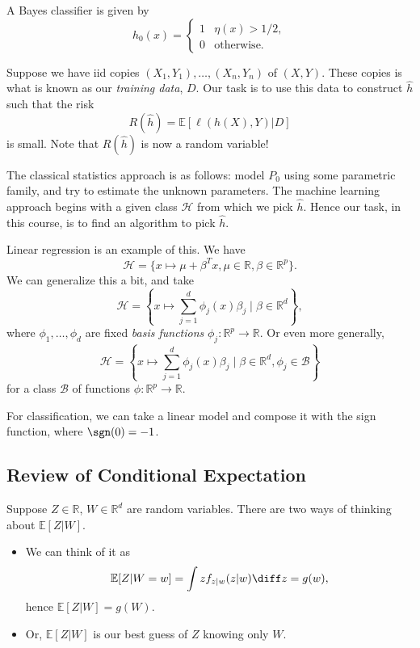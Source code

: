 \documentclass[12pt]{article}
\begin{document}
\begin{proposition}
	A Bayes classifier is given by
	\[
	h_0(x) =
	\begin{cases}
		1 & \eta(x) > 1/2, \\
		0 & \text{otherwise}.
	\end{cases}
	\]
\end{proposition}

Suppose we have iid copies $(X_1, Y_1), \ldots, (X_n, Y_n)$ of $(X, Y)$. These copies is what is known as our \emph{training data}, $D$. Our task is to use this data to construct $\hat h$ such that the risk
\[
R(\hat h) = \mathbb{E}[\ell(h(X), Y) | D]
\]
is small. Note that $R(\hat h)$ is now a random variable!

The classical statistics approach is as follows: model $P_0$ using some parametric family, and try to estimate the unknown parameters. The machine learning approach begins with a given class $\mathcal{H}$ from which we pick $\hat h$. Hence our task, in this course, is to find an algorithm to pick $\hat h$.

\begin{exbox}
	Linear regression is an example of this. We have
	\[
		\mathcal{H} = \{x \mapsto \mu + \beta^{T}x, \mu \in \mathbb{R}, \beta \in \mathbb{R}^p\}.
	\]
	We can generalize this a bit, and take
	\[
		\mathcal{H} = \left\{ x \mapsto \sum_{j = 1}^d \phi_j(x) \beta_j \mid \beta \in \mathbb{R}^d \right\},
	\]
	where $\phi_1, \ldots, \phi_d$ are fixed \emph{basis functions} $\phi_j : \mathbb{R}^p \to \mathbb{R}$. Or even more generally,
	\[
		\mathcal{H} = \left\{ x \mapsto \sum_{j = 1}^d \phi_j(x) \beta_j \mid \beta \in \mathbb{R}^d, \phi_j \in \mathcal{B} \right\}
	\]
	for a class $\mathcal{B}$ of functions $\phi : \mathbb{R}^p \to \mathbb{R}$.

	For classification, we can take a linear model and compose it with the sign function, where $\sgn(0) = -1$.
\end{exbox}

\subsection{Review of Conditional Expectation}
\label{sub:cond_ex}

Suppose $Z \in \mathbb{R}$, $W \in \mathbb{R}^d$ are random variables. There are two ways of thinking about $\mathbb{E}[Z|W]$.
\begin{itemize}
	\item We can think of it as
		\[
		\mathbb{E}[Z | W = w] = \int z f_{z|w}(z|w) \diff z = g(w),
		\]
		hence $\mathbb{E}[Z|W] = g(W)$.
	\item Or, $\mathbb{E}[Z|W]$ is our best guess of $Z$ knowing only $W$.
\end{itemize}
\end{document}
